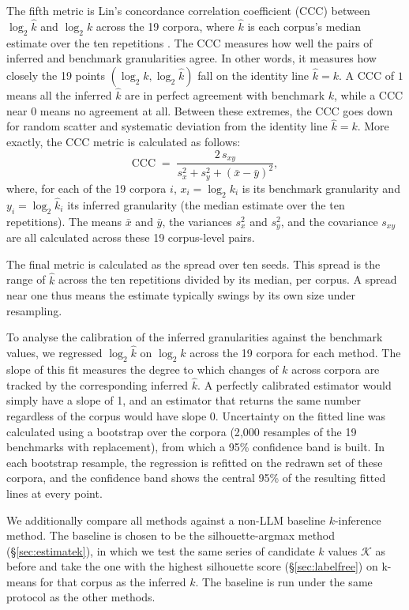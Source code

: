 \documentclass[11pt,a4paper,oneside]{report}
\begin{document}
The fifth metric is Lin's concordance correlation coefficient (CCC) between $\log_2 \hat{k}$ and $\log_2 k$ across the 19 corpora, where $\hat{k}$ is each corpus's median estimate over the ten repetitions \citep{lin1989concordance}. The CCC measures how well the pairs of inferred and benchmark granularities agree. In other words, it measures how closely the 19 points $(\log_2 k, \log_2 \hat{k})$ fall on the identity line $\hat{k} = k$. A CCC of $1$ means all the inferred $\hat{k}$ are in perfect agreement with benchmark $k$, while a CCC near $0$ means no agreement at all. Between these extremes, the CCC goes down for random scatter and systematic deviation from the identity line $\hat{k} = k$. More exactly, the CCC metric is calculated as follows:
\[
\mathrm{CCC} \;=\; \frac{2\,s_{xy}}{s_x^2 + s_y^2 + \left(\bar{x} - \bar{y}\right)^2},
\]
where, for each of the 19 corpora $i$, $x_i = \log_2 k_i$ is its benchmark granularity and $y_i = \log_2 \hat{k}_i$ its inferred granularity (the median estimate over the ten repetitions). The means $\bar{x}$ and $\bar{y}$, the variances $s_x^2$ and $s_y^2$, and the covariance $s_{xy}$ are all calculated across these 19 corpus-level pairs.

The final metric is calculated as the spread over ten seeds. This spread is the range of $\hat{k}$ across the ten repetitions divided by its median, per corpus. A spread near one thus means the estimate typically swings by its own size under resampling.

To analyse the calibration of the inferred granularities against the benchmark values, we regressed $\log_2 \hat{k}$ on $\log_2 k$ across the 19 corpora for each method. The slope of this fit measures the degree to which changes of $k$ across corpora are tracked by the corresponding inferred $\hat{k}$. A perfectly calibrated estimator would simply have a slope of 1, and an estimator that returns the same number regardless of the corpus would have slope 0. Uncertainty on the fitted line was calculated using a bootstrap over the corpora (2{,}000 resamples of the 19 benchmarks with replacement), from which a 95\% confidence band is built. In each bootstrap resample, the regression is refitted on the redrawn set of these corpora, and the confidence band shows the central 95\% of the resulting fitted lines at every point.

We additionally compare all methods against a non-LLM baseline $k$-inference method. The baseline is chosen to be the silhouette-argmax method (\S\ref{sec:estimatek}), in which we test the same series of candidate $k$ values $\mathcal{K}$ as before and take the one with the highest silhouette score (\S\ref{sec:labelfree}) on k-means for that corpus as the inferred $k$. The baseline is run under the same protocol as the other methods.
\end{document}
